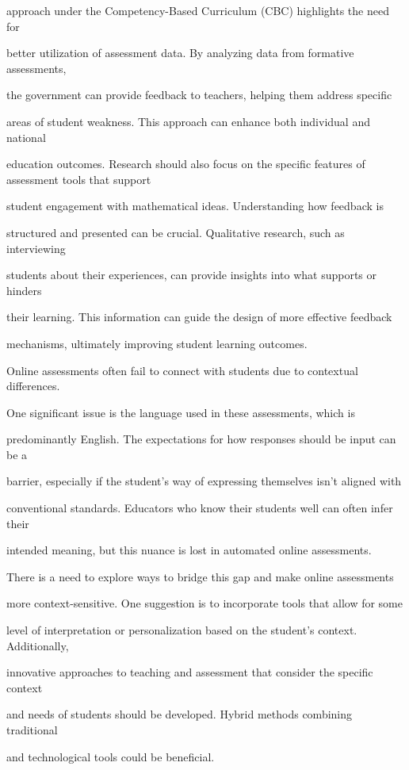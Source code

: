 \documentclass[11pt]{article}
\begin{document}
approach under the Competency-Based Curriculum (CBC) highlights the need for

better utilization of assessment data. By analyzing data from formative assessments,

the government can provide feedback to teachers, helping them address specific

areas of student weakness. This approach can enhance both individual and national

education outcomes. Research should also focus on the specific features of assessment tools that support

student engagement with mathematical ideas. Understanding how feedback is

structured and presented can be crucial. Qualitative research, such as interviewing

students about their experiences, can provide insights into what supports or hinders

their learning. This information can guide the design of more effective feedback

mechanisms, ultimately improving student learning outcomes.

Online assessments often fail to connect with students due to contextual differences.

One significant issue is the language used in these assessments, which is

predominantly English. The expectations for how responses should be input can be a

barrier, especially if the student's way of expressing themselves isn't aligned with

conventional standards. Educators who know their students well can often infer their

intended meaning, but this nuance is lost in automated online assessments.

There is a need to explore ways to bridge this gap and make online assessments

more context-sensitive. One suggestion is to incorporate tools that allow for some

level of interpretation or personalization based on the student's context. Additionally,

innovative approaches to teaching and assessment that consider the specific context

and needs of students should be developed. Hybrid methods combining traditional

and technological tools could be beneficial.
\end{document}
